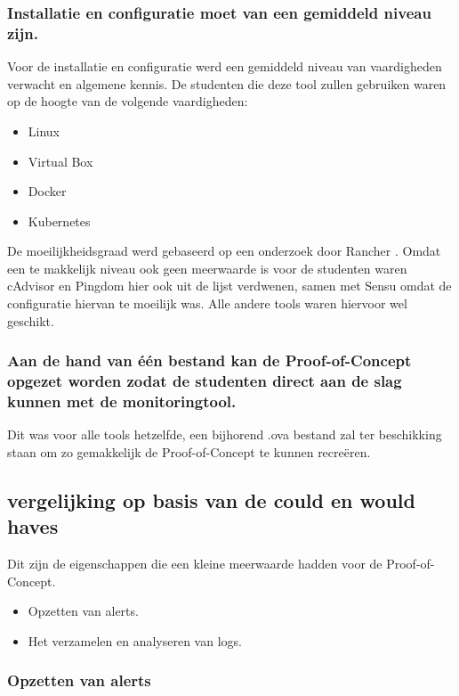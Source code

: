 \subsubsection{Installatie en configuratie moet van een gemiddeld niveau zijn.}

Voor de installatie en configuratie werd een gemiddeld niveau van vaardigheden verwacht en algemene kennis. De studenten die deze tool zullen gebruiken waren op de hoogte van de volgende vaardigheden:

\begin{itemize}
    \item Linux
    \item Virtual Box
    \item Docker
    \item Kubernetes
\end{itemize}

De moeilijkheidsgraad werd gebaseerd op een onderzoek door Rancher \autocite{Sissons2021}. Omdat een te makkelijk niveau ook geen meerwaarde is voor de studenten waren cAdvisor en Pingdom hier ook uit de lijst verdwenen, samen met Sensu omdat de configuratie hiervan te moeilijk was. Alle andere tools waren hiervoor wel geschikt.

\subsubsection{Aan de hand van één bestand kan de Proof-of-Concept opgezet worden zodat de studenten direct aan de slag kunnen met de monitoringtool.}

Dit was voor alle tools hetzelfde, een bijhorend .ova bestand zal ter beschikking staan om zo gemakkelijk de Proof-of-Concept te kunnen recreëren.
\clearpage
\subsection{vergelijking op basis van de could en would haves}

Dit zijn de eigenschappen die een kleine meerwaarde hadden voor de Proof-of-Concept.

\begin{itemize}
    \item Opzetten van alerts.
    \item Het verzamelen en analyseren van logs. 
\end{itemize}

\subsubsection{Opzetten van alerts}

